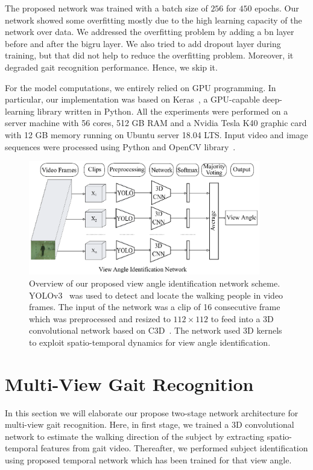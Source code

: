 The proposed network was trained with a batch size of $ 256 $ for $ 450 $ epochs. Our network showed some overfitting mostly due to the high learning capacity of the network over data. We addressed the overfitting problem by adding a \gls{bn} layer before and after the \gls{bigru} layer. We also tried to add dropout layer during training, but that did not help to reduce the overfitting problem. Moreover, it degraded gait recognition performance. Hence, we skip it.

For the model computations, we entirely relied on GPU programming. In particular, our implementation was based on Keras~\cite{keras}, a GPU-capable deep-learning library written in Python. All the experiments were performed on a server machine with 56 cores, 512 GB RAM and a Nvidia Tesla K40 graphic card with 12 GB memory running on Ubuntu server 18.04 LTS. Input video and image sequences were processed using Python and OpenCV library~\cite{opencv}.




\begin{figure}
	\centering
	\includegraphics[width=0.9\textwidth]{figures/view_angle_identification.eps}
	\caption[Overview of our proposed view angle identification network scheme] 
	{Overview of our proposed view angle identification network scheme. YOLOv3~\cite{Redmon_18} was used to detect and locate the walking people in video frames. The input of the network was a clip of 16 consecutive frame which was preprocessed and resized to $112\times112$ to feed into a 3D convolutional network based on C3D~\cite{Tran_15}. The network used 3D kernels to exploit spatio-temporal dynamics for view angle identification. \label{fig:view_angle_identification}
	}
\end{figure}

\section{Multi-View Gait Recognition}
In this section we will elaborate our propose two-stage network architecture for multi-view gait recognition. Here, in first stage, we trained a 3D convolutional network to estimate the walking direction of the subject by extracting spatio-temporal features from gait video. Thereafter, we performed subject identification using proposed temporal network which has been trained for that view angle.


